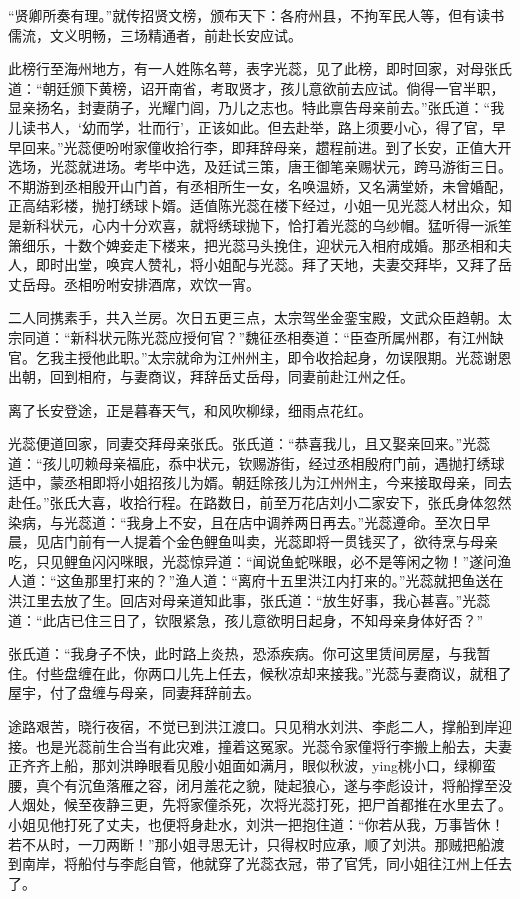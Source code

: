 \documentclass[12pt,UTF8]{ctexbook}
\begin{document}
{	“贤卿所奏有理。”就传招贤文榜，颁布天下：各府州县，不拘军民人等，但有读书儒流，文义明畅，三场精通者，前赴长安应试。
	
	此榜行至海州地方，有一人姓陈名萼，表字光蕊，见了此榜，即时回家，对母张氏道：“朝廷颁下黄榜，诏开南省，考取贤才，孩儿意欲前去应试。倘得一官半职，显亲扬名，封妻荫子，光耀门闾，乃儿之志也。特此禀告母亲前去。”张氏道：“我儿读书人，‘幼而学，壮而行’，正该如此。但去赴举，路上须要小心，得了官，早早回来。”光蕊便吩咐家僮收拾行李，即拜辞母亲，趱程前进。到了长安，正值大开选场，光蕊就进场。考毕中选，及廷试三策，唐王御笔亲赐状元，跨马游街三日。不期游到丞相殷开山门首，有丞相所生一女，名唤温娇，又名满堂娇，未曾婚配，正高结彩楼，抛打绣球卜婿。适值陈光蕊在楼下经过，小姐一见光蕊人材出众，知是新科状元，心内十分欢喜，就将绣球抛下，恰打着光蕊的乌纱帽。猛听得一派笙箫细乐，十数个婢妾走下楼来，把光蕊马头挽住，迎状元入相府成婚。那丞相和夫人，即时出堂，唤宾人赞礼，将小姐配与光蕊。拜了天地，夫妻交拜毕，又拜了岳丈岳母。丞相吩咐安排酒席，欢饮一宵。
	
	二人同携素手，共入兰房。次日五更三点，太宗驾坐金銮宝殿，文武众臣趋朝。太宗同道：“新科状元陈光蕊应授何官？”魏征丞相奏道：“臣查所属州郡，有江州缺官。乞我主授他此职。”太宗就命为江州州主，即令收拾起身，勿误限期。光蕊谢恩出朝，回到相府，与妻商议，拜辞岳丈岳母，同妻前赴江州之任。
	
	离了长安登途，正是暮春天气，和风吹柳绿，细雨点花红。
	
	光蕊便道回家，同妻交拜母亲张氏。张氏道：“恭喜我儿，且又娶亲回来。”光蕊道：“孩儿叨赖母亲福庇，忝中状元，钦赐游街，经过丞相殷府门前，遇抛打绣球适中，蒙丞相即将小姐招孩儿为婿。朝廷除孩儿为江州州主，今来接取母亲，同去赴任。”张氏大喜，收拾行程。在路数日，前至万花店刘小二家安下，张氏身体忽然染病，与光蕊道：“我身上不安，且在店中调养两日再去。”光蕊遵命。至次日早晨，见店门前有一人提着个金色鲤鱼叫卖，光蕊即将一贯钱买了，欲待烹与母亲吃，只见鲤鱼闪闪咪眼，光蕊惊异道：“闻说鱼蛇咪眼，必不是等闲之物！”遂问渔人道：“这鱼那里打来的？”渔人道：“离府十五里洪江内打来的。”光蕊就把鱼送在洪江里去放了生。回店对母亲道知此事，张氏道：“放生好事，我心甚喜。”光蕊道：“此店已住三日了，钦限紧急，孩儿意欲明日起身，不知母亲身体好否？”
	
	张氏道：“我身子不快，此时路上炎热，恐添疾病。你可这里赁间房屋，与我暂住。付些盘缠在此，你两口儿先上任去，候秋凉却来接我。”光蕊与妻商议，就租了屋宇，付了盘缠与母亲，同妻拜辞前去。
	
	途路艰苦，晓行夜宿，不觉已到洪江渡口。只见稍水刘洪、李彪二人，撑船到岸迎接。也是光蕊前生合当有此灾难，撞着这冤家。光蕊令家僮将行李搬上船去，夫妻正齐齐上船，那刘洪睁眼看见殷小姐面如满月，眼似秋波，ying桃小口，绿柳蛮腰，真个有沉鱼落雁之容，闭月羞花之貌，陡起狼心，遂与李彪设计，将船撑至没人烟处，候至夜静三更，先将家僮杀死，次将光蕊打死，把尸首都推在水里去了。小姐见他打死了丈夫，也便将身赴水，刘洪一把抱住道：“你若从我，万事皆休！若不从时，一刀两断！”那小姐寻思无计，只得权时应承，顺了刘洪。那贼把船渡到南岸，将船付与李彪自管，他就穿了光蕊衣冠，带了官凭，同小姐往江州上任去了。
	
}
\end{document}
